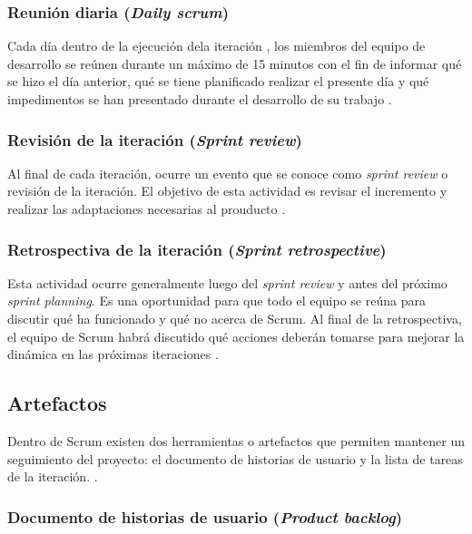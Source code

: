 \subsubsection{Reunión diaria (\textit{Daily scrum})}

Cada día dentro de la ejecución dela iteración , los miembros del equipo de desarrollo se reúnen durante un máximo de 15 minutos con el fin de informar qué se hizo el día anterior, qué se tiene planificado realizar el presente día y qué impedimentos se han presentado durante el desarrollo de su trabajo \cite{SCRM12}.

\subsubsection{Revisión de la iteración (\textit{Sprint review})}

Al final de cada iteración, ocurre un evento que se conoce como \textit{sprint review} o revisión de la iteración. El objetivo de esta actividad es revisar el incremento y realizar las adaptaciones necesarias al prouducto \cite{SCRM12}.

\subsubsection{Retrospectiva de la iteración (\textit{Sprint retrospective})}

Esta actividad ocurre generalmente luego del \textit{sprint review} y antes del próximo \textit{sprint planning}. Es una oportunidad para que todo el equipo se reúna para discutir qué ha funcionado y qué no acerca de Scrum. Al final de la retrospectiva, el equipo de Scrum habrá discutido qué acciones deberán tomarse para mejorar la dinámica en las próximas iteraciones \cite{SCRM2}. 

\subsection{Artefactos}

Dentro de Scrum existen dos herramientas o artefactos que permiten mantener un seguimiento del proyecto: el documento de historias de usuario y la lista de tareas de la iteración. \cite{SCRM2}.

\subsubsection{Documento de historias de usuario (\textit{Product backlog})}

